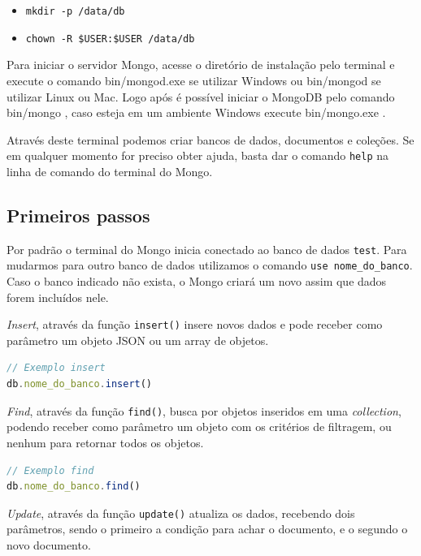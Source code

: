 \documentclass[
	12pt,				%
	openright,			%
	twoside,			%
	a4paper,			%
	english,			%
	brazil				%
	]{abntex2}
\begin{document}
\begin{itemize}
\item \verb|mkdir -p /data/db|
\item \verb|chown -R $USER:$USER /data/db|
\end{itemize}

Para iniciar o servidor Mongo, acesse o diretório de instalação pelo terminal e execute o comando bin/mongod.exe se utilizar Windows ou bin/mongod se utilizar Linux ou Mac. Logo após é possível iniciar o MongoDB pelo comando bin/mongo , caso esteja em um ambiente Windows execute bin/mongo.exe .

Através deste terminal podemos criar bancos de dados, documentos e coleções. Se em qualquer momento for preciso obter ajuda, basta dar o comando \verb|help| na linha de comando do terminal do Mongo.

\subsection{Primeiros passos}

Por padrão o terminal do Mongo inicia conectado ao banco de dados \verb|test|. Para mudarmos para outro banco de dados utilizamos o comando \verb|use nome_do_banco|. Caso o banco indicado não exista, o Mongo criará um novo assim que dados forem incluídos nele.

\textit{Insert}, através da função \verb|insert()| insere novos dados e pode receber como parâmetro um objeto JSON ou um array de objetos.

\begin{lstlisting}[language=javascript]
// Exemplo insert
db.nome_do_banco.insert()
\end{lstlisting}

\textit{Find}, através da função \verb|find()|, busca por objetos inseridos em uma \textit{collection}, podendo receber como parâmetro um objeto com os critérios de filtragem, ou nenhum para retornar todos os objetos.
 
\begin{lstlisting}[language=javascript]
// Exemplo find
db.nome_do_banco.find()
\end{lstlisting}

\textit{Update}, através da função \verb|update()| atualiza os dados, recebendo dois parâmetros, sendo o primeiro a condição para achar o documento, e o segundo o novo documento.
\end{document}

